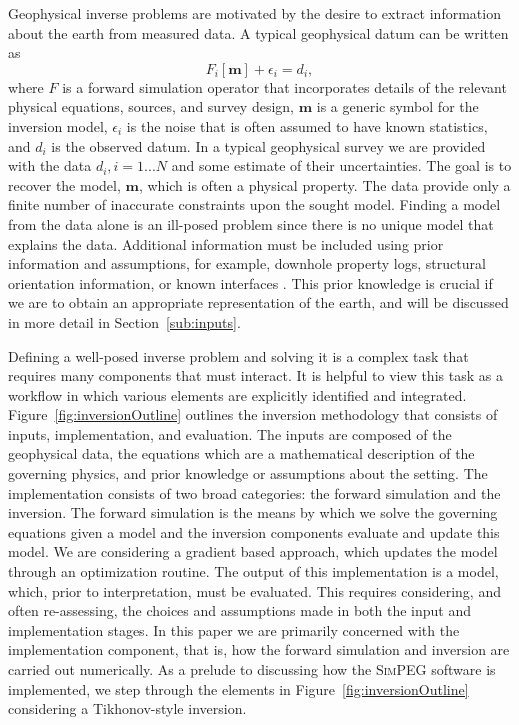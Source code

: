 \documentclass[preprint,review,3p,times,onecolumn,authoryear]{elsarticle}
\newcommand{\SimPEG}{\textsc{SimPEG}\xspace}
\newcommand{\m}{\mathbf{m}}
\begin{document}
Geophysical inverse problems are motivated by the desire to extract information about the earth from measured data.
A typical geophysical datum can be written as
{%
\begin{equation}
\label{eq:genericdatum}
F_i[\m] + \epsilon_i= d_i,
\end{equation}
}
where $F$ is a forward simulation operator that incorporates details of the
relevant physical equations, sources, and survey design, $\m$ is a generic
symbol for the inversion model, $\epsilon_{i}$ is the noise that is often assumed to have known statistics,
and $d_i$ is the observed datum.
In a typical geophysical survey we are provided with the data $d_i, i=1...N$ and
some estimate of their uncertainties. The goal
is to recover the model, $\m$, which is often a physical property. The data provide only a
finite number of inaccurate constraints upon the sought model.
Finding a model from the data alone is an ill-posed problem since there is no unique model that explains the data.
Additional information must be included using prior information and assumptions,
for example, downhole property logs, structural orientation information, or known interfaces \citep{Fullagar2008,Li2000,lelievre2009integrating}.
This prior knowledge is crucial if we are to obtain an appropriate
representation of the earth, and will be discussed in more detail in Section~\ref{sub:inputs}.


Defining a well-posed inverse problem and solving it is a complex task that
requires many components that must interact. It is helpful to view this task as a workflow in which various
elements are explicitly identified and integrated. Figure~\ref{fig:inversionOutline}
outlines the inversion methodology that consists of inputs, implementation, and evaluation. The
inputs are composed of the geophysical data, the equations which are a mathematical
description of the governing physics, and prior knowledge or assumptions about the
setting. The implementation consists of two broad categories: the forward simulation
and the inversion. The forward simulation is the means by which we solve the
governing equations given a model and the inversion components evaluate and update this model.
We are considering a gradient based approach, which updates the model through an optimization routine.
The output of this implementation is a model, which, prior to interpretation, must be evaluated. This requires considering, and often re-assessing, the choices and assumptions made in both the input and implementation stages.
In this paper we are primarily concerned with the implementation component, that is,
how the forward simulation and inversion are carried out numerically. As a prelude
to discussing how the \SimPEG software is implemented, we step through the elements
in Figure~\ref{fig:inversionOutline} considering a Tikhonov-style inversion.
\end{document}
